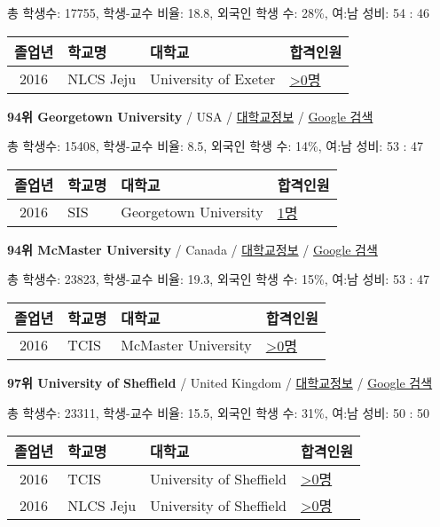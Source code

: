 \documentclass[13pt,]{article}
\begin{document}
총 학생수: 17755, 학생-교수 비율: 18.8, 외국인 학생 수: 28\%, 여:남
성비: 54 : 46

\begin{longtable}[]{@{}clll@{}}
\toprule
졸업년 & 학교명 & 대학교 & 합격인원\tabularnewline
\midrule
\endhead
2016 & NLCS Jeju & University of Exeter &
\href{http://cafe.naver.com/assarabia/11592}{\textgreater{}0명}\tabularnewline
\bottomrule
\end{longtable}

\textbf{94위 Georgetown University} / USA /
\href{https://www.timeshighereducation.com/world-university-rankings/georgetown-university?ranking-dataset=133819}{대학교정보}
/ \href{http://www.google.com/search?q=Georgetown+University}{Google
검색}

총 학생수: 15408, 학생-교수 비율: 8.5, 외국인 학생 수: 14\%, 여:남 성비:
53 : 47

\begin{longtable}[]{@{}clll@{}}
\toprule
졸업년 & 학교명 & 대학교 & 합격인원\tabularnewline
\midrule
\endhead
2016 & SIS & Georgetown University &
\href{http://cafe.naver.com/assarabia/11589}{1명}\tabularnewline
\bottomrule
\end{longtable}

\textbf{94위 McMaster University} / Canada /
\href{https://www.timeshighereducation.com/world-university-rankings/mcmaster-university?ranking-dataset=133819}{대학교정보}
/ \href{http://www.google.com/search?q=McMaster+University}{Google 검색}

총 학생수: 23823, 학생-교수 비율: 19.3, 외국인 학생 수: 15\%, 여:남
성비: 53 : 47

\begin{longtable}[]{@{}clll@{}}
\toprule
졸업년 & 학교명 & 대학교 & 합격인원\tabularnewline
\midrule
\endhead
2016 & TCIS & McMaster University &
\href{http://cafe.naver.com/assarabia/11598}{\textgreater{}0명}\tabularnewline
\bottomrule
\end{longtable}

\textbf{97위 University of Sheffield} / United Kingdom /
\href{https://www.timeshighereducation.com/world-university-rankings/university-of-sheffield?ranking-dataset=133819}{대학교정보}
/ \href{http://www.google.com/search?q=University+of+Sheffield}{Google
검색}

총 학생수: 23311, 학생-교수 비율: 15.5, 외국인 학생 수: 31\%, 여:남
성비: 50 : 50

\begin{longtable}[]{@{}clll@{}}
\toprule
졸업년 & 학교명 & 대학교 & 합격인원\tabularnewline
\midrule
\endhead
2016 & TCIS & University of Sheffield &
\href{http://cafe.naver.com/assarabia/11598}{\textgreater{}0명}\tabularnewline
2016 & NLCS Jeju & University of Sheffield &
\href{http://cafe.naver.com/assarabia/11592}{\textgreater{}0명}\tabularnewline
\bottomrule
\end{longtable}
\end{document}
